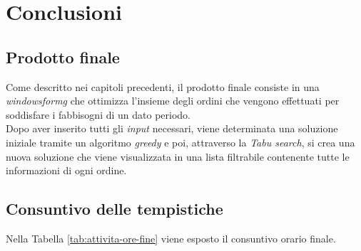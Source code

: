 
\chapter{Conclusioni}
\label{cap:conclusioni}
\noindent {}
\section{Prodotto finale}
\noindent Come descritto nei capitoli precedenti, il prodotto finale consiste in una \textit{\gls{windowsformg}} che
ottimizza l'insieme degli ordini che vengono effettuati per soddisfare i
fabbisogni di un dato periodo.\\

\noindent Dopo aver inserito tutti gli \textit{input} necessari,
viene determinata una soluzione iniziale tramite un algoritmo \textit{greedy} e poi, attraverso la
\textit{Tabu search}, si crea una nuova soluzione che viene visualizzata in una lista
filtrabile contenente tutte le informazioni di ogni ordine.

\section{Consuntivo delle tempistiche}
\noindent Nella Tabella \ref{tab:attivita-ore-fine} viene esposto il consuntivo orario finale.
\renewcommand{\arraystretch}{1.6}

